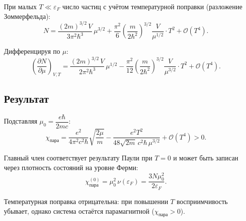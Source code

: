 \documentclass[12pt,a4paper]{article}
\begin{document}
При малых $T \ll \varepsilon_F$ число частиц с учётом температурной поправки (разложение Зоммерфельда):
\begin{equation}
    N = \frac{(2m)^{3/2}\,V}{3\pi^2\hbar^3}\,\mu^{3/2}
        + \frac{\pi^2}{6}\left(\frac{m}{2\hbar^2}\right)^{3/2}
          \frac{V}{\mu^{1/2}}\cdot T^2 + \mathcal{O}(T^4).
\end{equation}

Дифференцируя по $\mu$:
\begin{equation}
    \left(\frac{\partial N}{\partial \mu}\right)_{V,T} =
        \frac{(2m)^{3/2}\,V}{2\pi^2\hbar^3}\,\mu^{1/2}
        - \frac{\pi^2}{12}\left(\frac{m}{2\hbar^2}\right)^{3/2}
          \frac{V}{\mu^{3/2}}\cdot T^2 + \mathcal{O}(T^4).
\end{equation}

\subsection*{Результат}

Подставляя $\mu_0 = \dfrac{e\hbar}{2mc}$:
\begin{equation}
    \boxed{
    \chi_\text{пара} =
        \frac{e^2}{4\pi^2 c^2 \hbar}\sqrt{\frac{2\mu}{m}}
        - \frac{e^2 T^2}{48\sqrt{2m}\,c^2\hbar\,\mu^{3/2}}
        + \mathcal{O}(T^4) > 0.
    }
\end{equation}

\vspace{0.5em}
\noindent
Главный член соответствует результату Паули при $T=0$ и может быть записан через плотность состояний на уровне Ферми:
\begin{equation}
    \chi_\text{пара}^{(0)} = \mu_0^2\, \nu(\varepsilon_F) = \frac{3N\mu_0^2}{2\varepsilon_F}.
\end{equation}

Температурная поправка отрицательна: при повышении $T$ восприимчивость убывает, однако система остаётся парамагнитной ($\chi_\text{пара} > 0$).
\end{document}
